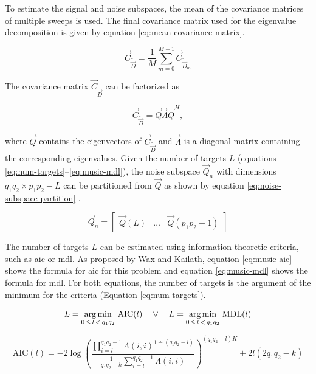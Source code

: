 To estimate the signal and noise subspaces, the mean of the covariance matrices of multiple sweeps is used.
The final covariance matrix used for the eigenvalue decomposition is given by equation \ref{eq:mean-covariance-matrix}.
\cite{music-based-algo}

\begin{equation}
    \label{eq:mean-covariance-matrix}
    \vec{C}_{\tilde{\vec{D}}} = \frac{1}{M} \sum_{m=0}^{M-1} \vec{C}_{\tilde{\vec{D}}_m}
\end{equation}

The covariance matrix $\vec{C}_{\tilde{\vec{D}}}$ can be factorized as

\begin{equation}
    \vec{C}_{\tilde{\vec{D}}} = \vec{Q} \vec{\Lambda} \vec{Q}^{H},
\end{equation}

where $\vec{Q}$ contains the eigenvectors of $\vec{C}_{\tilde{\vec{D}}}$ and $\vec{\Lambda}$ is a diagonal matrix containing the corresponding eigenvalues.
Given the number of targets $L$ (equations \ref{eq:num-targets}--\ref{eq:music-mdl}),
the noise subspace $\vec{Q}_{n}$ with dimensions  $q_{1}q_{2} \times p_{1}p_{2} - L$
can be partitioned from $\vec{Q}$ as shown by equation \ref{eq:noise-subspace-partition} \cite{2d-music-van-rossum}.

\begin{equation}
    \label{eq:noise-subspace-partition}
    \vec{Q}_{n} = \begin{bmatrix} \vec{Q}(L) & \ldots & \vec{Q}(p_{1}p_{2} - 1) \end{bmatrix}
\end{equation}

The number of targets $L$ can be estimated using information theoretic criteria, such as \gls{aic} or \gls{mdl}.
As proposed by Wax and Kailath, equation \ref{eq:music-aic} shows the formula for \gls{aic} for this problem
and equation \ref{eq:music-mdl} shows the formula for \gls{mdl}.
For both equations, the number of targets is the argument of the minimum for the criteria (Equation \ref{eq:num-targets}).
\cite{wax-kailath-85}

\begin{equation}
    \label{eq:num-targets}
    L = \operatorname*{arg\,min}\limits_{0\,\leq\,l\,<\,q_{1}q_{2}}\, \mathrm{AIC}(l) \quad \vee \quad L = \operatorname*{arg\,min}\limits_{0\,\leq\,l\,<\,q_{1}q_{2}}\, \mathrm{MDL}(l)
\end{equation}

\begin{equation}
    \label{eq:music-aic}
    \mathrm{AIC}(l) = -2 \log \left(
        \frac
            {\prod\limits_{i = l}^{q_{1}q_{2}-1} \Lambda(i,i)^{1 \div (q_{1}q_{2} - l)}} 
            {\frac{1}{q_{1}q_{2}-k} \sum\limits_{i=l}^{q_{1}q_{2}-1} \Lambda(i,i)}
    \right)^{(q_{1}q_{2}-l)K} + 2l(2q_{1}q_{2}-k)
\end{equation}


